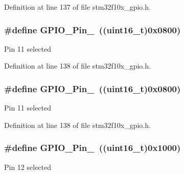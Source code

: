 Definition at line 137 of file stm32f10x\+\_\+gpio.\+h.

\subsubsection[{\texorpdfstring{G\+P\+I\+O\+\_\+\+Pin\+\_\+11}{GPIO_Pin_11}}]{\setlength{\rightskip}{0pt plus 5cm}\#define G\+P\+I\+O\+\_\+\+Pin\+\_~(({\bf uint16\+\_\+t})0x0800)}\hypertarget{group___g_p_i_o__pins__define_ga5139d5bc3d15784ae7794ed2ae1ff767}{}\label{group___g_p_i_o__pins__define_ga5139d5bc3d15784ae7794ed2ae1ff767}
Pin 11 selected 

Definition at line 138 of file stm32f10x\+\_\+gpio.\+h.

\subsubsection[{\texorpdfstring{G\+P\+I\+O\+\_\+\+Pin\+\_\+11}{GPIO_Pin_11}}]{\setlength{\rightskip}{0pt plus 5cm}\#define G\+P\+I\+O\+\_\+\+Pin\+\_~(({\bf uint16\+\_\+t})0x0800)}\hypertarget{group___g_p_i_o__pins__define_ga5139d5bc3d15784ae7794ed2ae1ff767}{}\label{group___g_p_i_o__pins__define_ga5139d5bc3d15784ae7794ed2ae1ff767}
Pin 11 selected 

Definition at line 138 of file stm32f10x\+\_\+gpio.\+h.

\subsubsection[{\texorpdfstring{G\+P\+I\+O\+\_\+\+Pin\+\_\+12}{GPIO_Pin_12}}]{\setlength{\rightskip}{0pt plus 5cm}\#define G\+P\+I\+O\+\_\+\+Pin\+\_~(({\bf uint16\+\_\+t})0x1000)}\hypertarget{group___g_p_i_o__pins__define_gada91257dcaab2c86f75fbd8e4b52b98c}{}\label{group___g_p_i_o__pins__define_gada91257dcaab2c86f75fbd8e4b52b98c}
Pin 12 selected 

